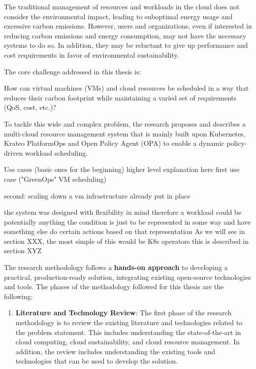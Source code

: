 \label{sec:problem}

The traditional management of resources and workloads in the cloud does not consider the environmental impact, leading to suboptimal energy usage and excessive carbon emissions.
However, users and organizations, even if interested in reducing carbon emissions and energy consumption, may not have the necessary systems to do so.
In addition, they may be reluctant to give up performance and cost requirements in favor of environmental sustainability.

The core challenge addressed in this thesis is:
\begin{center}
    How can virtual machines (VMs) and cloud resources be scheduled in a way that reduces their carbon footprint while maintaining a varied set of requirements (QoS, cost, etc.)?
\end{center}

To tackle this wide and complex problem, the research proposes and describes a multi-cloud resource management system that is mainly built upon Kubernetes, Krateo PlatformOps and Open Policy Agent (OPA) to enable a dynamic policy-driven workload scheduling. 




Use cases (basic ones for the beginning) higher level explanation here
first use case ("GreenOps" VM scheduling)

second: scaling down a vm 
infrastructure already put in place

the system was designed with flexibility in mind therefore a workload could be potentially anything
the condition is just to be represented in some way and have something else do certain actions based on that representation
As we will see in section XXX, the most simple of this would be K8s operators
this is described in section XYZ


The research methodology follows a \textbf{hands-on approach} to developing a practical, production-ready solution, integrating existing open-source technologies and tools.
The phases of the methodology followed for this thesis are the following:
\begin{enumerate}
    \item \textbf{Literature and Technology Review}: The first phase of the research methodology is to review the existing literature and technologies related to the problem statement. 
    This includes understanding the state-of-the-art in cloud computing, cloud sustainability, and cloud resource management. 
    In addition, the review includes understanding the existing tools and technologies that can be used to develop the solution.
\end{enumerate}









